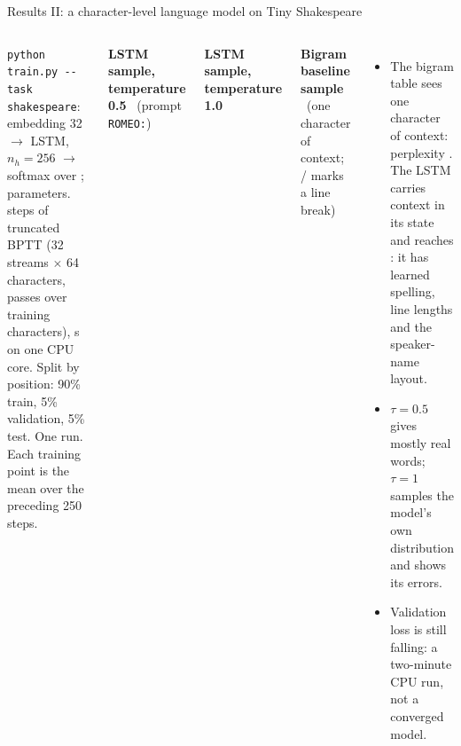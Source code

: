 \documentclass[aspectratio=169,10pt]{beamer}
\begin{document}
\begin{frame}[fragile]{Results II: a character-level language model on Tiny Shakespeare}
\begin{columns}[T,onlytextwidth]
\vspace{1mm}
\raggedright
{\scriptsize\color{cTok}\texttt{python train.py -{}-task shakespeare}: embedding 32 $\to$ LSTM, $n_h=256$ $\to$
softmax over \shkVocab; \shkParams{} parameters. \shkSteps{} steps of truncated BPTT (32 streams $\times$ 64
characters, \shkEpochs{} passes over \shkNtrain{} training characters), \shkSeconds{} s on one CPU
core. Split by position: 90\% train, 5\% validation, 5\% test. One run. Each training point is the
mean over the preceding 250 steps.\par}
\footnotesize
\textbf{LSTM sample, temperature 0.5} \ (prompt \texttt{ROMEO:})

\textbf{LSTM sample, temperature 1.0}

\textbf{Bigram baseline sample} \ (one character of context; / marks a line break)

\vspace{0.5mm}
\begin{itemize}
  \item The bigram table sees one character of context: perplexity \shkBigramPpl. The
        LSTM carries context in its state and reaches \shkTestPpl: it has learned spelling, line
        lengths and the speaker-name layout.
  \item $\tau=0.5$ gives mostly real words; $\tau=1$ samples the model's own distribution and
        shows its errors.
  \item Validation loss is still falling: a two-minute CPU run, not a converged model.
\end{itemize}
\end{columns}
\end{frame}
\end{document}
